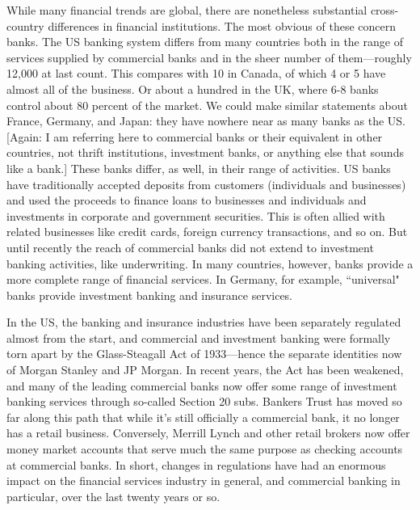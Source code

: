 \documentclass[letterpaper,12pt]{article}
\begin{document}
     While many financial trends are global, there are nonetheless
substantial cross-country differences in financial institutions.  The most obvious of these
concern banks.  The US banking system differs from many countries both in the range of services
supplied by commercial banks and in the sheer number of them---roughly 12,000 at last count.  This
compares with 10 in Canada, of which 4 or 5 have almost all of the business.  Or about a hundred
in the UK, where 6-8 banks control about 80 percent of the market. We could make similar
statements about France, Germany, and Japan:  they have nowhere near as many banks as the US.
[Again: I am referring here to commercial banks or their equivalent in other countries, not thrift
institutions, investment banks, or anything else that sounds like a bank.] These banks differ, as
well, in their range of activities.  US banks have traditionally accepted deposits from customers
(individuals and businesses) and used the proceeds to finance loans to businesses and individuals
and investments in corporate and government securities.  This is often allied with related
businesses like credit cards, foreign currency transactions, and so on.  But until recently the
reach of commercial banks did not extend to investment banking activities, like underwriting.  In
many countries, however, banks provide a more complete range of financial services.   In Germany,
for example, ``universal" banks provide investment banking and insurance services.

     In the US, the banking and insurance industries have been separately
regulated almost from the start, and commercial and investment banking were formally torn apart by
the Glass-Steagall Act of 1933---hence the separate identities now of Morgan Stanley and JP
Morgan.  In recent years, the Act has been weakened, and many of the leading commercial banks now
offer some range of investment banking services through so-called Section 20 subs.  Bankers Trust
has moved so far along this path that while it's still officially a commercial bank, it no longer
has a retail business.  Conversely, Merrill Lynch and other retail brokers now offer money market
accounts that serve much the same purpose as checking accounts at commercial banks.  In short,
changes in regulations have had an enormous impact on the financial services industry in general,
and commercial banking in particular, over the last twenty years or so.
\end{document}

